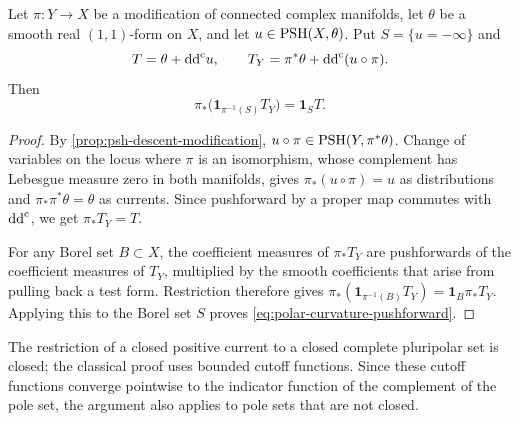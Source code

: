 \begin{proposition}\label{prop:polar-curvature-pushforward}
Let $\pi\colon Y\to X$ be a modification of connected complex manifolds, let $\theta$ be a smooth real $(1,1)$-form on $X$, and let $u\in\mathrm{PSH}(X,\theta)$. Put $S=\{u=-\infty\}$ and
\[
 T=\theta+\mathrm{dd}^{\mathrm{c}} u,\qquad
 T_Y=\pi^*\theta+\mathrm{dd}^{\mathrm{c}}(u\circ\pi).
\]
Then
\begin{equation}\label{eq:polar-curvature-pushforward}
 \pi_*\bigl(\mathbf1_{\pi^{-1}(S)}T_Y\bigr)=\mathbf1_ST.
\end{equation}
\end{proposition}
\begin{proof}
By \cref{prop:psh-descent-modification}, $u\circ\pi\in\mathrm{PSH}(Y,\pi^*\theta)$. Change of variables on the locus where $\pi$ is an isomorphism, whose complement has Lebesgue measure zero in both manifolds, gives $\pi_*(u\circ\pi)=u$ as distributions and $\pi_*\pi^*\theta=\theta$ as currents. Since pushforward by a proper map commutes with $\mathrm{dd}^{\mathrm{c}}$, we get $\pi_*T_Y=T$.

For any Borel set $B\subset X$, the coefficient measures of $\pi_*T_Y$ are pushforwards of the coefficient measures of $T_Y$, multiplied by the smooth coefficients that arise from pulling back a test form. Restriction therefore gives $\pi_*(\mathbf1_{\pi^{-1}(B)}T_Y)=\mathbf1_B\pi_*T_Y$. Applying this to the Borel set $S$ proves \eqref{eq:polar-curvature-pushforward}.
\end{proof}

The restriction of a closed positive current to a closed complete pluripolar set is closed; the classical proof uses bounded cutoff functions. Since these cutoff functions converge pointwise to the indicator function of the complement of the pole set, the argument also applies to pole sets that are not closed.

